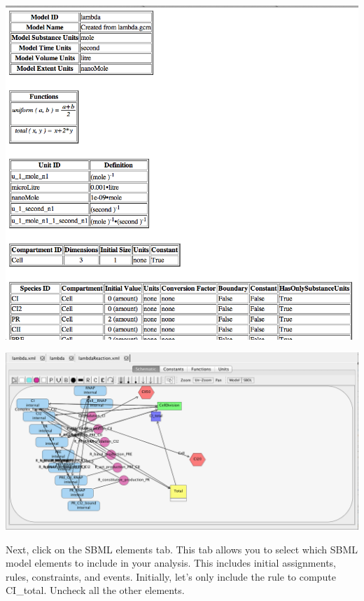 \documentclass[titlepage,11pt]{article}
\begin{document}
\begin{center}
\includegraphics[width=160mm]{screenshots/viewBrowser}
\end{center}

\begin{center}
\includegraphics[width=160mm]{screenshots/reactionModel}
\end{center}

Next, click on the SBML elements tab.  This tab allows you to select which SBML model elements to include in your analysis.  This includes initial assignments, rules, constraints, and events.  Initially, let's only include the rule to compute CI\_total.  Uncheck all the other elements.
\end{document}
